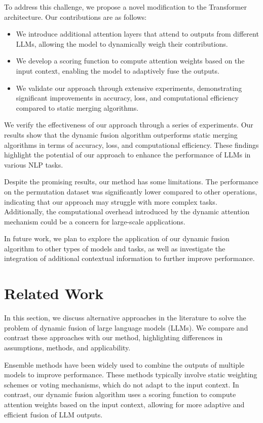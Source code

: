 \documentclass{article} %
\begin{document}
To address this challenge, we propose a novel modification to the Transformer architecture. Our contributions are as follows:
\begin{itemize}
    \item We introduce additional attention layers that attend to outputs from different LLMs, allowing the model to dynamically weigh their contributions.
    \item We develop a scoring function to compute attention weights based on the input context, enabling the model to adaptively fuse the outputs.
    \item We validate our approach through extensive experiments, demonstrating significant improvements in accuracy, loss, and computational efficiency compared to static merging algorithms.
\end{itemize}

We verify the effectiveness of our approach through a series of experiments. Our results show that the dynamic fusion algorithm outperforms static merging algorithms in terms of accuracy, loss, and computational efficiency. These findings highlight the potential of our approach to enhance the performance of LLMs in various NLP tasks.

Despite the promising results, our method has some limitations. The performance on the permutation dataset was significantly lower compared to other operations, indicating that our approach may struggle with more complex tasks. Additionally, the computational overhead introduced by the dynamic attention mechanism could be a concern for large-scale applications.

In future work, we plan to explore the application of our dynamic fusion algorithm to other types of models and tasks, as well as investigate the integration of additional contextual information to further improve performance.

\section{Related Work}
\label{sec:related}

In this section, we discuss alternative approaches in the literature to solve the problem of dynamic fusion of large language models (LLMs). We compare and contrast these approaches with our method, highlighting differences in assumptions, methods, and applicability.

Ensemble methods \citep{Dietterich2007EnsembleMI} have been widely used to combine the outputs of multiple models to improve performance. These methods typically involve static weighting schemes or voting mechanisms, which do not adapt to the input context. In contrast, our dynamic fusion algorithm uses a scoring function to compute attention weights based on the input context, allowing for more adaptive and efficient fusion of LLM outputs.
\end{document}
